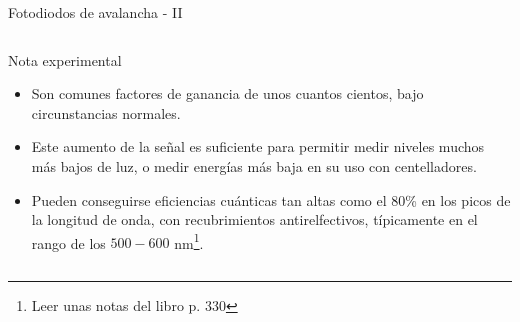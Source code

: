 \documentclass[a4paper,10pt]{beamer}
\begin{document}
\begin{frame}{Fotodiodos de avalancha - II}
\begin{columns}[c]
 \begin{exampleblock}{Nota experimental}
 \footnotesize
  \begin{itemize}
   \item \begin{justify}
          Son comunes factores de ganancia de unos cuantos cientos, bajo circunstancias 
          normales.
         \end{justify}
    \item \begin{justify}
          Este aumento de la señal es suficiente para permitir medir niveles muchos 
          más bajos de luz, o medir energías más baja en su uso con centelladores.
         \end{justify}
    \item \begin{justify}
          Pueden conseguirse eficiencias cuánticas tan altas como el 80\% en los 
          picos de la longitud de onda, con recubrimientos antirelfectivos, típicamente
          en el rango de los $500-600$ nm\footnote{Leer unas notas del libro p. 330}.
        \end{justify}
  \end{itemize}

 \end{exampleblock}

 
\end{columns}
\end{frame}
\end{document}
